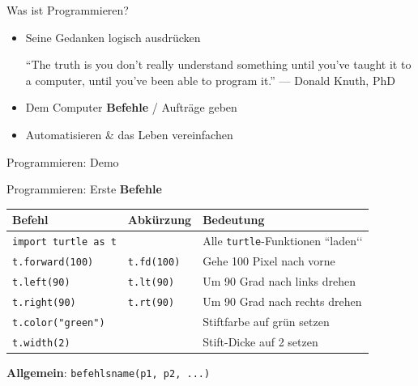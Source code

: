 \begin{frame}{Was ist Programmieren?}
	\begin{itemize}[<+->]
		\item {} Seine Gedanken logisch ausdrücken
		      \begin{displayquote}
			      ``The truth is you don’t really understand something until you’ve taught it to a computer, until you’ve been able to program it.'' --- Donald Knuth, PhD
		      \end{displayquote}
		\item {} Dem Computer \textbf{Befehle} / Aufträge geben
		\item {} Automatisieren \& das Leben vereinfachen

	\end{itemize}
\end{frame}

\begin{frame}{Programmieren: Demo}
\end{frame}

\begin{frame}[fragile]{Programmieren: Erste \textbf{Befehle}}
	\begin{table}[H]
		\centering
		\footnotesize
		\begin{tabular}{l|l|p{4cm}}
			\textbf{Befehl}                                      & \textbf{Abkürzung}                          & \textbf{Bedeutung}                        \\\midrule\midrule
			\lstinline|import turtle as t| &                                             & Alle \lstinline|turtle|-Funktionen ``laden‘‘         \\\midrule
			\lstinline|t.forward(100)|          & \lstinline|t.fd(100)|      & Gehe 100 Pixel nach vorne                 \\\midrule
			\lstinline|t.left(90)|              & \lstinline|t.lt(90)|       & Um 90 Grad nach links drehen              \\\midrule
			\lstinline|t.right(90)|             & \lstinline|t.rt(90)|       & Um 90 Grad nach rechts drehen             \\\midrule
			\lstinline|t.color("green")|  &  & Stiftfarbe auf grün setzen                \\\midrule
			\lstinline|t.width(2)|        &       & Stift-Dicke auf 2 setzen                  \\
		\end{tabular}
	\end{table}

	\textbf{Allgemein}: \lstinline|befehlsname(p1, p2, ...)|
\end{frame}


